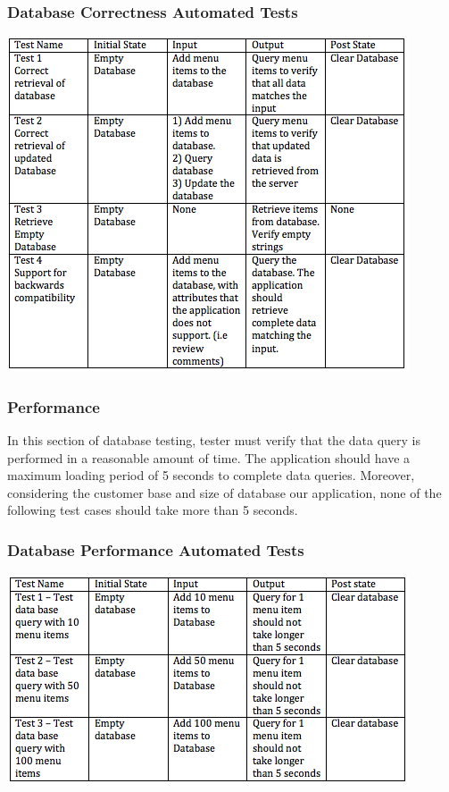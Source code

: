\documentclass[12pt]{article}
\begin{document}
\subsubsection{Database Correctness Automated Tests }
\includegraphics[width=\textwidth,height=\textheight,keepaspectratio]{correctness_tests.png}

\subsubsection{Performance}
In this section of database testing, tester must verify that the data query is performed in a reasonable amount of time. The application should have a maximum loading period of 5 seconds to complete data queries. Moreover, considering the customer base and size of database our application, none of the following test cases should take more than 5 seconds.
\subsubsection{Database Performance Automated Tests }
\includegraphics[width=\textwidth,height=\textheight,keepaspectratio]{performance_tests.png}
\end{document}
